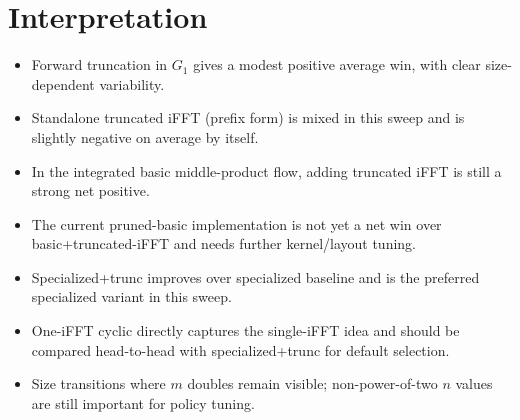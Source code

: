 \documentclass[11pt]{article}
\begin{document}
\section{Interpretation}
\begin{itemize}
\item Forward truncation in \(G_1\) gives a modest positive average win, with clear size-dependent variability.
\item Standalone truncated iFFT (prefix form) is mixed in this sweep and is slightly negative on average by itself.
\item In the integrated basic middle-product flow, adding truncated iFFT is still a strong net positive.
\item The current pruned-basic implementation is not yet a net win over basic+truncated-iFFT and needs further kernel/layout tuning.
\item Specialized+trunc improves over specialized baseline and is the preferred specialized variant in this sweep.
\item One-iFFT cyclic directly captures the single-iFFT idea and should be compared head-to-head with specialized+trunc for default selection.
\item Size transitions where \(m\) doubles remain visible; non-power-of-two \(n\) values are still important for policy tuning.
\end{itemize}
\end{document}

